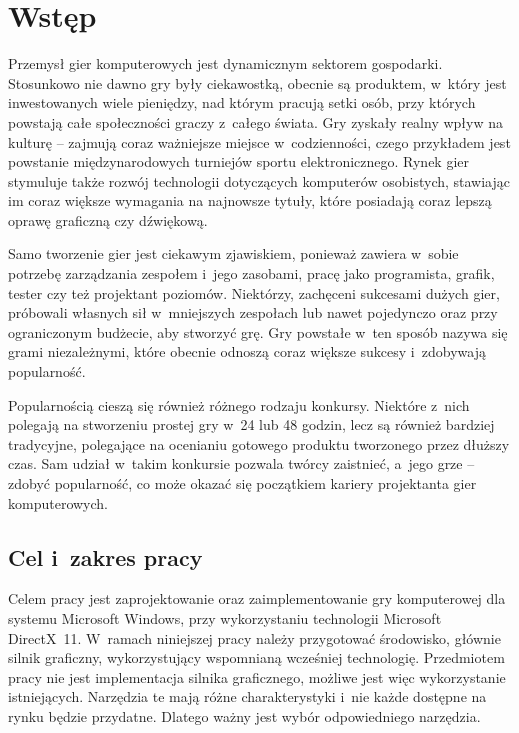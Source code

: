 
\chapter{Wst\k{e}p}

Przemysł gier komputerowych jest dynamicznym sektorem gospodarki. Stosunkowo nie dawno gry były ciekawostką, obecnie są produktem, w~który jest inwestowanych wiele pieniędzy, nad którym pracują setki osób, przy których powstają całe społeczności graczy z~całego świata. Gry zyskały realny wpływ na kulturę -- zajmują coraz ważniejsze miejsce w~codzienności, czego przykładem jest powstanie międzynarodowych turniejów sportu elektronicznego. Rynek gier stymuluje także rozwój technologii dotyczących komputerów osobistych, stawiając im coraz większe wymagania na najnowsze tytuły, które posiadają coraz lepszą oprawę graficzną czy dźwiękową.

Samo tworzenie gier jest ciekawym zjawiskiem, ponieważ zawiera w~sobie potrzebę zarządzania zespołem i~jego zasobami, pracę jako programista, grafik, tester czy też projektant poziomów. Niektórzy, zachęceni sukcesami dużych gier, próbowali własnych sił w~mniejszych zespołach lub nawet pojedynczo oraz przy ograniczonym budżecie, aby stworzyć grę.
Gry powstałe w~ten sposób nazywa się grami niezależnymi, które obecnie odnoszą coraz większe sukcesy i~zdobywają popularność.

Popularnością cieszą się również różnego rodzaju konkursy. Niektóre z~nich polegają na stworzeniu prostej gry w~24 lub 48 godzin, lecz są również bardziej tradycyjne, polegające na ocenianiu gotowego produktu tworzonego przez dłuższy czas. Sam udział w~takim konkursie pozwala twórcy zaistnieć, a~jego grze -- zdobyć popularność, co może okazać się początkiem kariery projektanta gier komputerowych.



\section{Cel i~zakres pracy}

Celem pracy jest zaprojektowanie oraz zaimplementowanie gry komputerowej dla systemu Microsoft Windows, przy wykorzystaniu technologii Microsoft DirectX~11. W~ramach niniejszej pracy należy przygotować środowisko, głównie silnik graficzny, wykorzystujący wspomnianą wcześniej technologię. Przedmiotem pracy nie jest implementacja silnika graficznego, możliwe jest więc wykorzystanie istniejących. Narzędzia te mają różne charakterystyki i~nie każde dostępne na rynku będzie przydatne. Dlatego ważny jest wybór odpowiedniego narzędzia. 

